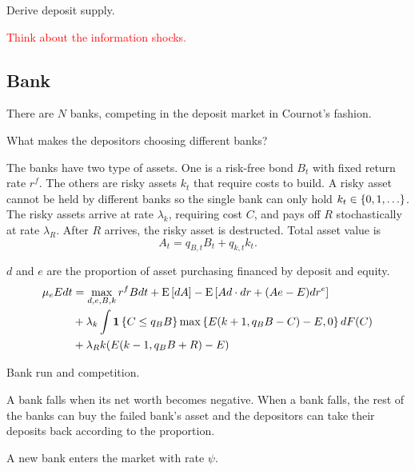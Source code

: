 \documentclass[a4paper, 12pt]{article}
\begin{document}
Derive deposit supply. 

\textcolor{red}{Think about the information shocks.}

\subsection{Bank}
There are $N$ banks, competing in the deposit market in Cournot's fashion. 

What makes the depositors choosing different banks?

The banks have two type of assets. One is a risk-free bond $B_t$ with fixed 
return rate $r^f$. The others are risky assets $k_t$ that require costs to build. 
A risky asset cannot be held by different banks so the single bank can 
only hold $k_t\in\left\{ {0,1,\ldots} \right\}$. The risky assets arrive at rate $\lambda_k$, 
requiring cost $C$, and pays off $R$ stochastically at rate $\lambda_R$. After 
$R$ arrives, the risky asset is destructed. Total asset value is 
\begin{equation}
    A_t = q_{B,t}B_t + q_{k,t}k_t. 
\end{equation}

$d$ and $e$ are the proportion of asset purchasing financed by deposit 
and equity. 
\begin{equation}
    \begin{split}
        \mu_eEdt &= \max_{d,e,B,k} r^fBdt + {\operatorname{E}}\left[ {dA} \right] - {\operatorname{E}}\left[ {Ad\cdot dr + (Ae - E)dr^e} \right] \\
        &+ \lambda_k\int \mathbf{1}\left\{ {C\leq q_BB} \right\}\max\left\{ {E(k+1,q_BB-C)-E, 0} \right\}dF(C) \\ 
        &+ \lambda_Rk(E(k-1, q_BB+R) - E)
    \end{split}
\end{equation}

Bank run and competition. 

A bank falls when its net worth becomes negative. When a bank falls, the rest 
of the banks can buy the failed bank's asset and the depositors can take their 
deposits back according to the proportion. 

A new bank enters the market with rate $\psi$. 





\end{document}
